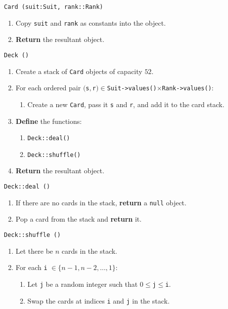 \algorithm
\texttt{Card (suit:Suit, rank::Rank)}
\begin{enumerate}
	\item Copy \texttt{suit} and \texttt{rank} as constants into the object.
	\item \textbf{Return} the resultant object.
\end{enumerate}
\vspace{8mm}
\texttt{Deck ()}
\begin{enumerate}
	\item Create a stack of \texttt{Card} objects of capacity $52$.
	\item For each ordered pair $($\texttt{s}$, $\texttt{r}$) \in $\texttt{Suit->values()}$\times$\texttt{Rank->values()}:
	\begin{enumerate}
		\item Create a new \texttt{Card}, pass it \texttt{s} and \texttt{r}, and add it to the card stack.
	\end{enumerate}
	\item \textbf{Define} the functions:
	\begin{enumerate}
		\item \texttt{Deck::deal()} 
		\item \texttt{Deck::shuffle()}
	\end{enumerate}
	\item \textbf{Return} the resultant object.
\end{enumerate}
\vspace{5mm}
\texttt{Deck::deal ()}
\begin{enumerate}
	\item If there are no cards in the stack, \textbf{return} a \texttt{null} object.
	\item Pop a card from the stack and \textbf{return} it.
\end{enumerate}
\vspace{5mm}
\texttt{Deck::shuffle ()}
\begin{enumerate}
	\item Let there be $n$ cards in the stack.
	\item For each \texttt{i} $ \in \{n-1, n-2, \dots, 1\}$:
	\begin{enumerate}
		\item Let \texttt{j} be a random integer such that $0 \le $\texttt{j}$ \le $\texttt{i}.
		\item Swap the cards at indices \texttt{i} and \texttt{j} in the stack.
	\end{enumerate}
\end{enumerate}

